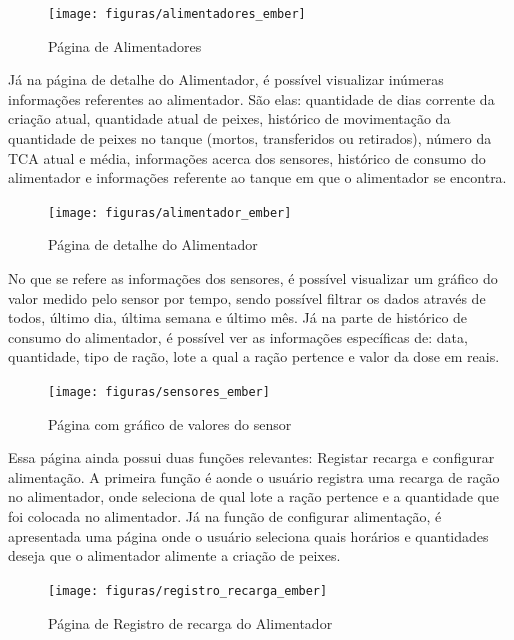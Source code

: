 \begin{figure}[H]
    \centering
    \texttt{[image: figuras/alimentadores\_ember]}
    \caption{Página de Alimentadores}
    \label{fig:alimentadores_ember}
\end{figure}

Já na página de detalhe do Alimentador, é possível visualizar inúmeras informações referentes ao alimentador. São elas:
quantidade de dias corrente da criação atual, quantidade atual de peixes, histórico de movimentação da quantidade de peixes no tanque (mortos, transferidos ou retirados),
número da TCA atual e média, informações acerca dos sensores, histórico de consumo do alimentador e informações referente ao tanque em que o alimentador se encontra.

\begin{figure}[H]
    \centering
    \texttt{[image: figuras/alimentador\_ember]}
    \caption{Página de detalhe do Alimentador}
    \label{fig:alimentador_ember}
\end{figure}

No que se refere as informações dos sensores, é possível visualizar um gráfico do valor medido pelo sensor por tempo, sendo possível filtrar os dados através de
todos, último dia, última semana e último mês. Já na parte de histórico de consumo do alimentador, é possível ver as informações específicas
de: data, quantidade, tipo de ração, lote a qual a ração pertence e valor da dose em reais.

\begin{figure}[H]
    \centering
    \texttt{[image: figuras/sensores\_ember]}
    \caption{Página com gráfico de valores do sensor}
    \label{fig:sensores_ember}
\end{figure}

Essa página ainda possui duas funções relevantes: Registar recarga e configurar alimentação. A primeira função é aonde
o usuário registra uma recarga de ração no alimentador, onde seleciona de qual lote a ração pertence e a quantidade que foi colocada no alimentador.
Já na função de configurar alimentação, é apresentada uma página onde o usuário seleciona quais horários e quantidades deseja que o alimentador alimente a criação de peixes.

\begin{figure}[H]
    \centering
    \texttt{[image: figuras/registro\_recarga\_ember]}
    \caption{Página de Registro de recarga do Alimentador}
    \label{fig:registro_recarga_ember}
\end{figure}

